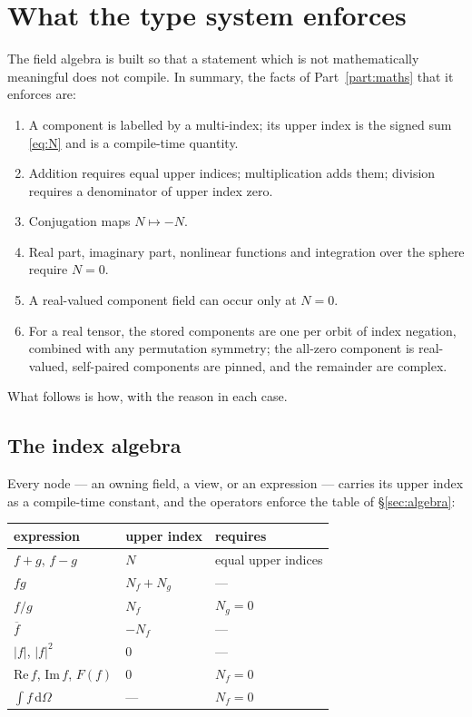 \documentclass[11pt,a4paper]{article}
\newcommand{\conj}[1]{\overline{#1}}
\newcommand{\dOmega}{\,\mathrm{d}\Omega}
\begin{document}
\section{What the type system enforces}
\label{sec:types}

The field algebra is built so that a statement which is not mathematically
meaningful does not compile.  In summary, the facts of Part~\ref{part:maths}
that it enforces are:
\begin{enumerate}
  \item A component is labelled by a multi-index; its upper index is the
    signed sum \eqref{eq:N} and is a compile-time quantity.
  \item Addition requires equal upper indices; multiplication adds them;
    division requires a denominator of upper index zero.
  \item Conjugation maps $N \mapsto -N$.
  \item Real part, imaginary part, nonlinear functions and integration
    over the sphere require $N = 0$.
  \item A real-valued component field can occur only at $N = 0$.
  \item For a real tensor, the stored components are one per orbit of
    index negation, combined with any permutation symmetry; the
    all-zero component is real-valued, self-paired components are pinned,
    and the remainder are complex.
\end{enumerate}
What follows is how, with the reason in each case.

\subsection{The index algebra}

Every node --- an owning field, a view, or an expression --- carries its
upper index as a compile-time constant, and the operators enforce the
table of \S\ref{sec:algebra}:

\begin{center}
\begin{tabular}{lll}
  \toprule
  expression & upper index & requires \\
  \midrule
  $f+g$, $f-g$ & $N$ & equal upper indices \\
  $fg$ & $N_f + N_g$ & --- \\
  $f/g$ & $N_f$ & $N_g = 0$ \\
  $\conj{f}$ & $-N_f$ & --- \\
  $|f|$, $|f|^2$ & $0$ & --- \\
  $\mathrm{Re}\,f$, $\mathrm{Im}\,f$, $F(f)$ & $0$ & $N_f = 0$ \\
  $\int f \dOmega$ & --- & $N_f = 0$ \\
  \bottomrule
\end{tabular}
\end{center}
\end{document}
